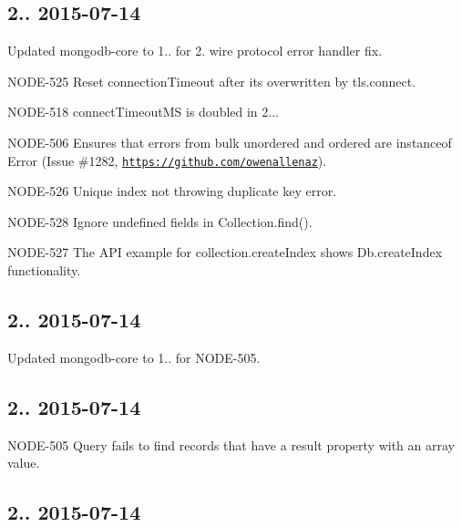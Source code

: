 \subsection*{2.. 2015-\/07-\/14 }


\begin{DoxyItemize}
\item Updated mongodb-\/core to 1.. for 2. wire protocol error handler fix.
\item N\+O\+D\+E-\/525 Reset connection\+Timeout after it\textquotesingle{}s overwritten by tls.\+connect.
\item N\+O\+D\+E-\/518 connect\+Timeout\+MS is doubled in 2...
\item N\+O\+D\+E-\/506 Ensures that errors from bulk unordered and ordered are instanceof Error (Issue \#1282, \href{https://github.com/owenallenaz}{\tt https\+://github.\+com/owenallenaz}).
\item N\+O\+D\+E-\/526 Unique index not throwing duplicate key error.
\item N\+O\+D\+E-\/528 Ignore undefined fields in Collection.\+find().
\item N\+O\+D\+E-\/527 The A\+PI example for collection.\+create\+Index shows Db.\+create\+Index functionality.
\end{DoxyItemize}

\subsection*{2.. 2015-\/07-\/14 }


\begin{DoxyItemize}
\item Updated mongodb-\/core to 1.. for N\+O\+D\+E-\/505.
\end{DoxyItemize}

\subsection*{2.. 2015-\/07-\/14 }


\begin{DoxyItemize}
\item N\+O\+D\+E-\/505 Query fails to find records that have a \textquotesingle{}result\textquotesingle{} property with an array value.
\end{DoxyItemize}

\subsection*{2.. 2015-\/07-\/14 }


